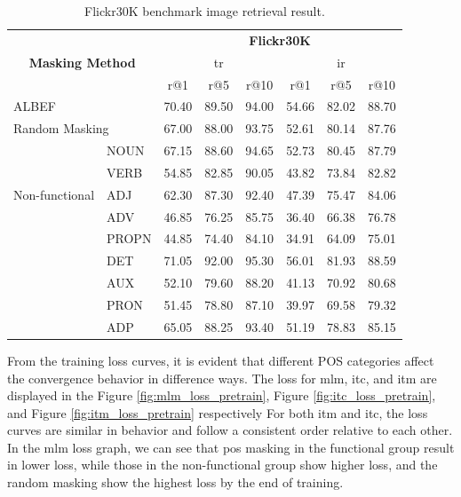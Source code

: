 \begin{table}[h]
    \centering
    \caption{Flickr30K benchmark image retrieval result.}
    \label{tab:flickr30k}
    \begin{adjustbox}{width=0.8\textwidth}
        \begin{tabular}{ll|ccc|ccc}
            \hline
            \multicolumn{2}{c|}{\multirow{3}{*}{\textbf{Masking Method}}} & \multicolumn{6}{c}{\textbf{Flickr30K}} \\
            \multicolumn{2}{l|}{} & \multicolumn{3}{c|}{\acrshort{tr}} & \multicolumn{3}{c}{\acrshort{ir}} \\
            \multicolumn{2}{l|}{} & r@1 & r@5 & r@10 & r@1 & r@5 & r@10 \\
            \hline
            \multicolumn{2}{l|}{ALBEF} & 70.40 & 89.50 & 94.00 & 54.66 & 82.02 & 88.70 \\
            \hline
            \multicolumn{2}{l|}{Random Masking} & 67.00 & 88.00 & 93.75 & 52.61 & 80.14 & 87.76 \\
            \hline
            \multirow{5}{*}{Non-functional} & NOUN & 67.15 & 88.60 & 94.65 & 52.73 & 80.45 & 87.79 \\
            & VERB & 54.85 & 82.85 & 90.05 & 43.82 & 73.84 & 82.82 \\
            & ADJ & 62.30 & 87.30 & 92.40 & 47.39 & 75.47 & 84.06 \\
            & ADV & 46.85 & 76.25 & 85.75 & 36.40 & 66.38 & 76.78 \\
            & PROPN & 44.85 & 74.40 & 84.10 & 34.91 & 64.09 & 75.01 \\
            \hline
            \rowcolor{gray} \multirow{4}{*}{Functional} & DET & 71.05 & 92.00 & 95.30 & 56.01 & 81.93 & 88.59 \\
            & AUX  & 52.10 & 79.60 & 88.20 & 41.13 & 70.92 & 80.68 \\
            & PRON & 51.45 & 78.80 & 87.10 & 39.97 & 69.58 & 79.32 \\
            & ADP & 65.05 & 88.25 & 93.40 & 51.19 & 78.83 & 85.15 \\
            \hline
        \end{tabular}
    \end{adjustbox}
\end{table}

From the training loss curves, it is evident that different POS categories affect the convergence behavior in difference ways.
The loss for \acrshort{mlm}, \acrshort{itc}, and \acrshort{itm} are displayed in the Figure \ref{fig:mlm_loss_pretrain}, Figure \ref{fig:itc_loss_pretrain}, and Figure \ref{fig:itm_loss_pretrain} respectively
For both \acrshort{itm} and \acrshort{itc}, the loss curves are similar in behavior and follow a consistent order relative to each other.
In the \acrshort{mlm} loss graph, we can see that \acrshort{pos} masking in the functional group result in lower loss, while those in the non-functional group show higher loss, and the random masking show the highest loss by the end of training.

